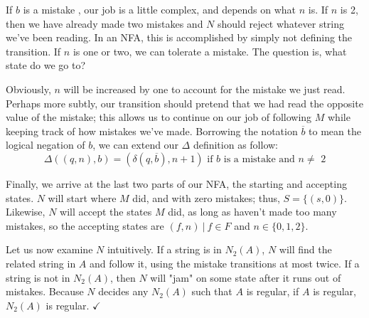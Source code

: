 \documentclass[11pt]{article}
\begin{document}
If $b$ is a mistake , our job is a little complex, and depends on what $n$ is. If $n$ is 2, then we have already made two mistakes and $N$ should reject whatever string we've been reading. In an NFA, this is accomplished by simply not defining the transition. If $n$ is one or two, we can tolerate a mistake. The question is, what state do we go to? 

Obviously, $n$ will be increased by one to account for the mistake we just read. Perhaps more subtly, our transition should pretend that we had read the opposite value of the mistake; this allows us to continue on our job of following $M$ while keeping track of how mistakes we've made. Borrowing the notation $\overline{b}$ to mean the logical negation of $b$, we can extend our $\Delta$ definition as follow:
	\[ \Delta( (q, n), b) = (\delta(q, \overline{b}), n+1) \text{ if $b$ is a mistake and $n \neq$ 2}\]
	
Finally, we arrive at the last two parts of our NFA, the starting and accepting states. $N$ will start where $M$ did, and with zero mistakes; thus, $S = \{ (s, 0) \}$. Likewise, $N$ will accept the states $M$ did, as long as haven't made too many mistakes, so the accepting states are $(f, n )\ |\ f \in F $ and $ n \in \{0, 1, 2\}$.

Let us now examine $N$ intuitively. If a string is in $N_2(A)$, $N$ will find the related string in $A$ and follow it, using the mistake transitions at most twice. If a string is not in $N_2(A)$, then $N$ will "jam" on some state after it runs out of mistakes. Because $N$ decides any $N_2(A)$ such that $A$ is regular, if $A$ is regular, $N_2(A)$ is regular. $\checkmark$
\end{document}
